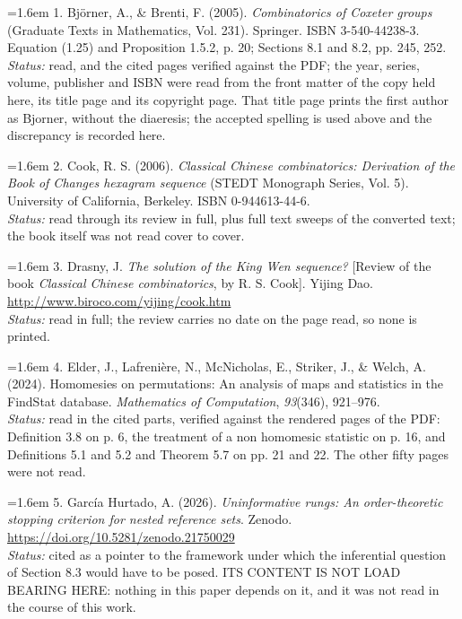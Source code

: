\documentclass[11pt,a4paper]{article}
\begin{document}
\begingroup
\setlength{\parindent}{0pt}
\hangindent=1.6em 1. Björner, A., \& Brenti, F. (2005). \emph{Combinatorics of Coxeter groups} (Graduate Texts in Mathematics, Vol. 231). Springer. ISBN 3-540-44238-3. Equation (1.25) and Proposition 1.5.2, p. 20; Sections 8.1 and 8.2, pp. 245, 252.\\ \emph{Status:} read, and the cited pages verified against the PDF; the year, series, volume, publisher and ISBN were read from the front matter of the copy held here, its title page and its copyright page. That title page prints the first author as Bjorner, without the diaeresis; the accepted spelling is used above and the discrepancy is recorded here.\par\vspace{0.5ex}
\hangindent=1.6em 2. Cook, R. S. (2006). \emph{Classical Chinese combinatorics: Derivation of the Book of Changes hexagram sequence} (STEDT Monograph Series, Vol. 5). University of California, Berkeley. ISBN 0-944613-44-6.\\ \emph{Status:} read through its review in full, plus full text sweeps of the converted text; the book itself was not read cover to cover.\par\vspace{0.5ex}
\hangindent=1.6em 3. Drasny, J. \emph{The solution of the King Wen sequence?} [Review of the book \emph{Classical Chinese combinatorics}, by R. S. Cook]. Yijing Dao. \url{http://www.biroco.com/yijing/cook.htm}\\ \emph{Status:} read in full; the review carries no date on the page read, so none is printed.\par\vspace{0.5ex}
\hangindent=1.6em 4. Elder, J., Lafrenière, N., McNicholas, E., Striker, J., \& Welch, A. (2024). Homomesies on permutations: An analysis of maps and statistics in the FindStat database. \emph{Mathematics of Computation}, \emph{93}(346), 921–976.\\ \emph{Status:} read in the cited parts, verified against the rendered pages of the PDF: Definition 3.8 on p. 6, the treatment of a non homomesic statistic on p. 16, and Definitions 5.1 and 5.2 and Theorem 5.7 on pp. 21 and 22. The other fifty pages were not read.\par\vspace{0.5ex}
\hangindent=1.6em 5. García Hurtado, A. (2026). \emph{Uninformative rungs: An order-theoretic stopping criterion for nested reference sets}. Zenodo. \url{https://doi.org/10.5281/zenodo.21750029}\\ \emph{Status:} cited as a pointer to the framework under which the inferential question of Section 8.3 would have to be posed. ITS CONTENT IS NOT LOAD BEARING HERE: nothing in this paper depends on it, and it was not read in the course of this work.\par\vspace{0.5ex}
\end{document}
